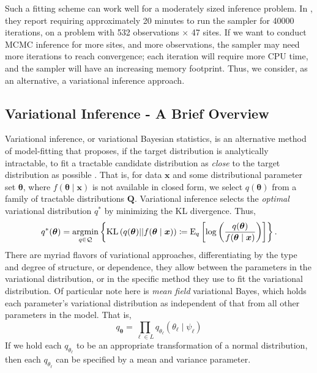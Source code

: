 Such a fitting scheme can work well for a moderately sized inference problem.  In 
    \cite{trubey:pg}, they report requiring approximately \num{20} minutes to run 
    the sampler for \num{40000} iterations, on a problem with \num{532} observations 
    $\times$ \num{47} sites.  If we want to conduct MCMC inference for more sites, 
    and more observations, the sampler may need more iterations to reach convergence; 
    each iteration will require more CPU time, and the sampler will have an increasing 
    memory footprint. Thus, we consider, as an alternative, a variational inference 
    approach.

\subsection{Variational Inference - A Brief Overview\label{sec:varbayes}}
Variational inference, or variational Bayesian statistics, is an alternative method of 
    model-fitting that proposes, if the target distribution is analytically intractable,
    to fit a tractable candidate distribution as \emph{close} to the target distribution
    as possible \citep{blei2017}. That is, for data $\bm{x}$ and some 
    distributional parameter set $\bm{\theta}$, where $f(\bm{\theta}\mid \bm{x})$ is not 
    available in closed form, we select $q(\bm{\theta})$ from a family of tractable distributions
    $\bm{Q}$.  Variational inference selects the \emph{optimal} variational distribution $q^*$
    by minimizing the KL divergence.  Thus,
    \begin{equation}
        \label{eqn:optimalq}
        q^*(\bm{\theta}) = \operatorname*{argmin}_{q\in\mathcal{Q}}\left\lbrace
        \text{KL}\left(q(\bm{\theta})||f(\bm{\theta}\mid\bm{x})\right) 
        \coloneqq
        \text{E}_{q}\left[\log\left(
        \frac{q(\bm{\theta})}{f(\bm{\theta}\mid\bm{x})}
        \right)\right]
        \right\rbrace.
    \end{equation}
    There are myriad flavors of variational approaches, differentiating by
    the type and degree of structure, or dependence, they allow between the parameters in
    the variational distribution, or in the specific method they use to fit the variational
    distribution.  Of particular note here is \emph{mean field} variational Bayes, which 
    holds each parameter's variational distribution as independent of that from all other 
    parameters in the model.  That is,
    \[
        q_{\bm{\theta}} = \prod_{\ell \in L}q_{\theta_{\ell}}(\theta_{\ell}\mid\psi_{\ell})
    \]
    If we hold each $q_{\theta_{\ell}}$ to be an appropriate transformation of a normal
    distribution, then each $q_{\theta_{\ell}}$ can be specified by a mean and variance 
    parameter. 

